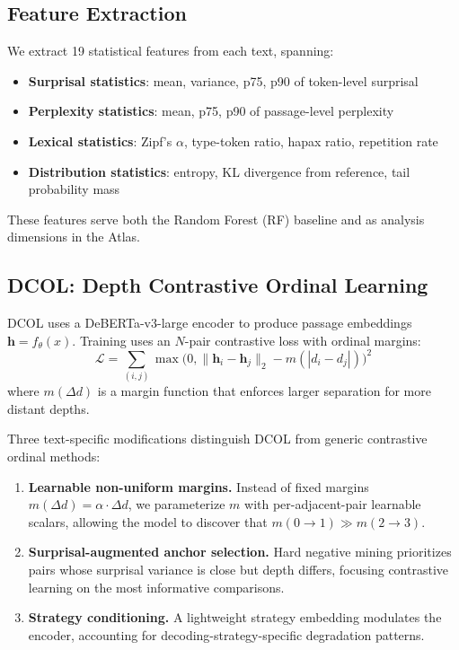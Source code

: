 \documentclass[11pt,a4paper]{article}
\begin{document}
\subsection{Feature Extraction}

We extract 19 statistical features from each text, spanning:
\begin{itemize}[leftmargin=*,topsep=2pt,itemsep=1pt]
\item \textbf{Surprisal statistics}: mean, variance, p75, p90 of token-level surprisal
\item \textbf{Perplexity statistics}: mean, p75, p90 of passage-level perplexity
\item \textbf{Lexical statistics}: Zipf's $\alpha$, type-token ratio, hapax ratio, repetition rate
\item \textbf{Distribution statistics}: entropy, KL divergence from reference, tail probability mass
\end{itemize}
These features serve both the Random Forest (RF) baseline and as analysis dimensions in the Atlas.

\subsection{DCOL: Depth Contrastive Ordinal Learning}

DCOL uses a DeBERTa-v3-large encoder to produce passage embeddings $\mathbf{h} = f_\theta(x)$.
Training uses an $N$-pair contrastive loss with ordinal margins:
\begin{equation}
\mathcal{L} = \sum_{(i,j)} \max\bigl(0, \|\mathbf{h}_i - \mathbf{h}_j\|_2 - m(|d_i - d_j|)\bigr)^2
\end{equation}
where $m(\Delta d)$ is a margin function that enforces larger separation for more distant depths.

Three text-specific modifications distinguish DCOL from generic contrastive ordinal methods:

\begin{enumerate}[leftmargin=*,topsep=2pt,itemsep=1pt]
\item \textbf{Learnable non-uniform margins.} Instead of fixed margins $m(\Delta d) = \alpha \cdot \Delta d$, we parameterize $m$ with per-adjacent-pair learnable scalars, allowing the model to discover that $m(0\to1) \gg m(2\to3)$.
\item \textbf{Surprisal-augmented anchor selection.} Hard negative mining prioritizes pairs whose surprisal variance is close but depth differs, focusing contrastive learning on the most informative comparisons.
\item \textbf{Strategy conditioning.} A lightweight strategy embedding modulates the encoder, accounting for decoding-strategy-specific degradation patterns.
\end{enumerate}
\end{document}
